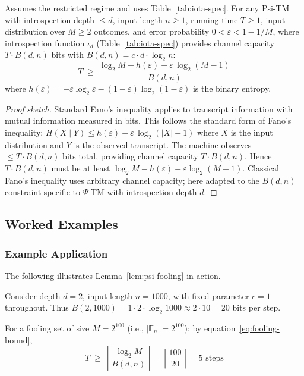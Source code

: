 \begin{lemma}
\label{lem:psi-fano}\label{Lk:psi-fano}
Assumes the restricted regime and uses Table~\ref{tab:iota-spec}.
For any Psi-TM with introspection depth $\leq d$, input length $n \geq 1$, running time $T \geq 1$, input distribution over $M \geq 2$ outcomes, and error probability $0 < \varepsilon < 1 - 1/M$, where introspection function $\iota_d$ (Table~\ref{tab:iota-spec}) provides channel capacity $T \cdot B(d,n)$ bits with $B(d,n) = c \cdot d \cdot \log_{2} n$:
\begin{equation}
\label{eq:fano-bound}
 T \;\geq\; \frac{\log_{2} M - h(\varepsilon) - \varepsilon\,\log_{2}(M-1)}{B(d,n)}
\end{equation}
where $h(\varepsilon) = -\varepsilon \log_{2} \varepsilon - (1-\varepsilon) \log_{2}(1-\varepsilon)$ is the binary entropy.
\end{lemma}

\begin{proof}[Proof sketch]
Standard Fano's inequality applies to transcript information with mutual information measured in bits. This follows the standard form of Fano's inequality: $H(X\mid Y) \leq h(\varepsilon) + \varepsilon \, \log_{2}(|X|-1)$ where $X$ is the input distribution and $Y$ is the observed transcript. The machine observes $\leq T \cdot B(d,n)$ bits total, providing channel capacity $T \cdot B(d,n)$. Hence $T \cdot B(d,n)$ must be at least $\log_{2} M - h(\varepsilon) - \varepsilon \log_{2}(M-1)$. Classical Fano's inequality uses arbitrary channel capacity; here adapted to the $B(d,n)$ constraint specific to $\Psi$-TM with introspection depth $d$.
\end{proof}

\subsection{Worked Examples}
\subsubsection{Example Application}
The following illustrates Lemma~\ref{lem:psi-fooling} in action.

Consider depth $d = 2$, input length $n = 1000$, with fixed parameter $c = 1$ throughout.
Thus $B(2,1000) = 1 \cdot 2 \cdot \log_{2} 1000 \approx 2 \cdot 10 = 20$ bits per step.

For a fooling set of size $M = 2^{100}$ (i.e., $|\mathbb{F}_n| = 2^{100}$): by equation~\eqref{eq:fooling-bound},
\[T \;\geq\; \left\lceil \frac{\log_{2} M}{B(d,n)} \right\rceil = \left\lceil \frac{100}{20} \right\rceil = 5 \text{ steps}\]

